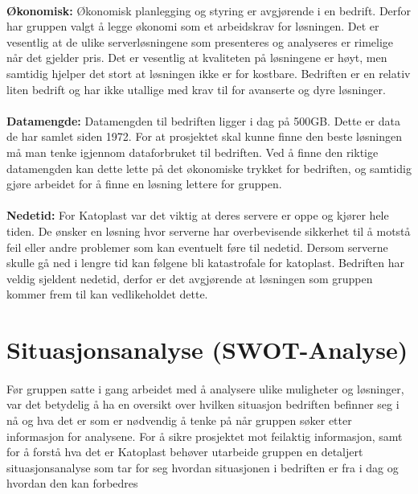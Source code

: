 \paragraph{}{\bfseries Økonomisk:} \hspace{-0.95em} Økonomisk planlegging og styring er avgjørende i en bedrift. Derfor har gruppen valgt å legge økonomi som et arbeidskrav for løsningen. Det er vesentlig at de ulike serverløsningene som presenteres og analyseres er rimelige når det gjelder pris. Det er vesentlig at kvaliteten på løsningene er høyt, men samtidig hjelper det stort at løsningen ikke er for kostbare. Bedriften er en relativ liten bedrift og har ikke utallige med krav til for avanserte og dyre løsninger.

\paragraph{}{\bfseries Datamengde:} \hspace{-0.95em} Datamengden til bedriften ligger i dag på 500GB. Dette er data de har samlet siden 1972. For at prosjektet skal kunne finne den beste løsningen må man tenke igjennom dataforbruket til bedriften. Ved å finne den riktige datamengden kan dette lette på det økonomiske trykket for bedriften, og samtidig gjøre arbeidet for å finne en løsning lettere for gruppen. 

\paragraph{}{\bfseries Nedetid:} \hspace{-0.95em} For Katoplast var det viktig at deres servere er oppe og kjører hele tiden. De ønsker en løsning hvor serverne har overbevisende sikkerhet til å motstå feil eller andre problemer som kan eventuelt føre til nedetid. Dersom serverne skulle gå ned i lengre tid kan følgene bli katastrofale for katoplast. Bedriften har veldig sjeldent nedetid, derfor er det avgjørende at løsningen som gruppen kommer frem til kan vedlikeholdet dette.

\section{Situasjonsanalyse (SWOT-Analyse)}
\paragraph{} Før gruppen satte i gang arbeidet med å analysere ulike muligheter og løsninger, var det betydelig å ha en oversikt over hvilken situasjon bedriften befinner seg i nå og hva det er som er nødvendig å tenke på når gruppen søker etter informasjon for analysene. For å sikre prosjektet mot feilaktig informasjon, samt for å forstå hva det er Katoplast behøver utarbeide gruppen en detaljert situasjonsanalyse som tar for seg hvordan situasjonen i bedriften er fra i dag og hvordan den kan forbedres

